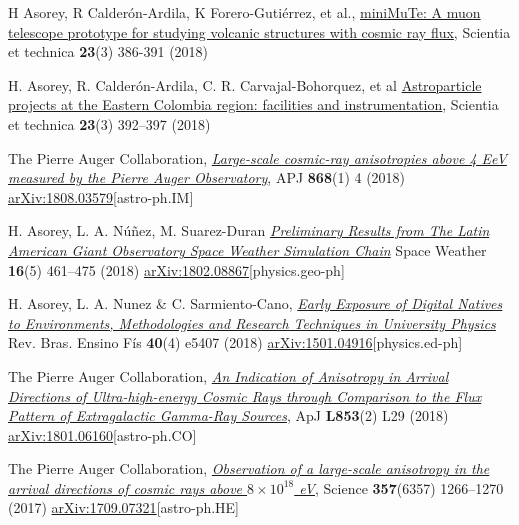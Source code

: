 \begin{etaremune}
\item {} H Asorey, R Calderón-Ardila, K Forero-Gutiérrez, et al., \href{http://dx.doi.org/10.22517/23447214.17501}{miniMuTe: A muon telescope prototype for studying volcanic structures with cosmic ray flux}, Scientia et technica {\bf{23}}(3) 386-391 (2018)

\item {}H. Asorey, R. Calderón-Ardila, C. R. Carvajal-Bohorquez, et al \href{http://dx.doi.org/10.22517/23447214.17561}{Astroparticle projects at the Eastern Colombia region: facilities and instrumentation}, Scientia et technica {\bf{23}}(3) 392--397 (2018)

\item {}The Pierre Auger Collaboration, \href{}{\emph{Large-scale cosmic-ray anisotropies above 4 EeV measured by the Pierre Auger Observatory}}, APJ {\bf{868}}(1) 4 (2018) \href{https://arxiv.org/abs/1808.03579}{arXiv:1808.03579}[astro-ph.IM]

\item {}H. Asorey, L. A. Núñez, M. Suarez-Duran \href{https://doi.org/10.1002/2017SW001774}{\emph{Preliminary Results from The Latin American Giant Observatory Space Weather Simulation Chain}} Space Weather {\bf{16}}(5) 461--475 (2018) \href{https://arxiv.org/abs/1802.08867}{arXiv:1802.08867}[physics.geo-ph]

\item {} H. Asorey, L. A. Nunez \& C. Sarmiento-Cano, \href{http://dx.doi.org/10.1590/1806-9126-rbef-2018-0092}{\emph{Early Exposure of Digital Natives to Environments, Methodologies and Research Techniques in University Physics}} Rev. Bras. Ensino Fís {\bf{40}}(4) e5407 (2018) \href{http://arxiv.org/abs/1501.04916}{arXiv:1501.04916}[physics.ed-ph]

\item {}The Pierre Auger Collaboration, \href{https://doi.org/10.3847/2041-8213/aaa66d}{\emph{An Indication of Anisotropy in Arrival Directions of Ultra-high-energy Cosmic Rays through Comparison to the Flux Pattern of Extragalactic Gamma-Ray Sources}}, ApJ {\bf{L853}}(2) L29 (2018) \href{https://arxiv.org/abs/1801.06160}{arXiv:1801.06160}[astro-ph.CO]

\item {}The Pierre Auger Collaboration, \href{https://doi.org/10.1126/science.aan4338}{\emph{Observation of a large-scale anisotropy in the arrival directions of cosmic rays above $8\times 10^{18}$ eV}}, Science {\bf{357}}(6357) 1266--1270 (2017) \href{https://arxiv.org/abs/1709.07321}{arXiv:1709.07321}[astro-ph.HE]


\end{etaremune}
